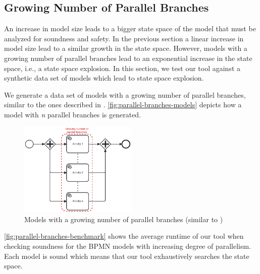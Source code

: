 \documentclass[runningheads]{llncs}
\begin{document}
\subsection{Growing Number of Parallel Branches} \label{subsec:degrees-of-parallelism}
An increase in model size leads to a bigger state space of the model that must be analyzed for soundness and safety.
In the previous section a linear increase in model size lead to a similar growth in the state space.
However, models with a growing number of parallel branches lead to an exponential increase in the state space, i.e., a state space explosion.
In this section, we test our tool against a synthetic data set of models which lead to state space explosion.

We generate a data set of models with a growing number of parallel branches, similar to the ones described in \cite{corradiniFormalApproachAnalysis2021}.
\autoref{fig:parallel-branches-models} depicts how a model with \textit{n} parallel branches is generated.

\begin{figure}[ht]
	\centering
	\includegraphics[width=0.5\textwidth]{images/growing-number-of-parallel-branches}
	\caption{Models with a growing number of parallel branches (similar to \cite{corradiniFormalApproachAnalysis2021})}
	\label{fig:parallel-branches-models}
\end{figure}


\autoref{fig:parallel-branches-benchmark} shows the average runtime of our tool when checking soundness for the BPMN models with increasing degree of parallelism.
Each model is sound which means that our tool exhaustively searches the state space.
\end{document}
